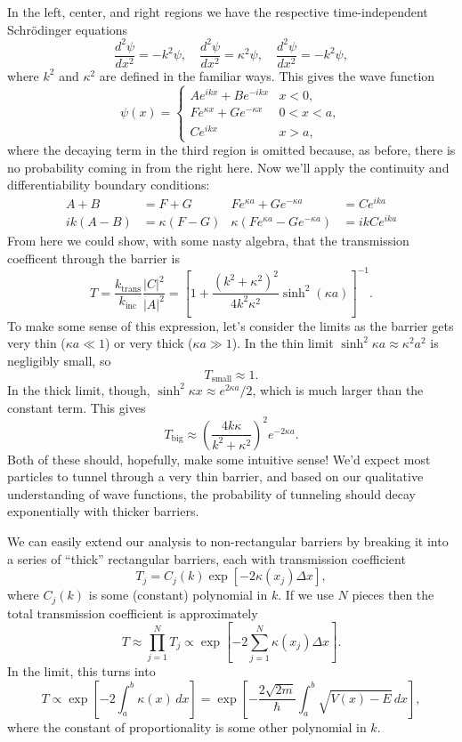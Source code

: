 \documentclass[../p052main.tex]{subfiles}
\begin{document}
In the left, center, and right regions we have the respective time-independent Schrödinger equations
\[ \frac{d^2 \psi}{d x^2} = -k^2 \psi, \quad \frac{d^2 \psi}{d x^2} = \kappa^2 \psi, \quad \frac{d^2 \psi}{d x^2} = -k^2 \psi, \]
where $k^2$ and $\kappa^2$ are defined in the familiar ways.
This gives the wave function
\[ \psi(x) = \begin{cases} Ae^{ikx} + Be^{-ikx} & x < 0, \\ Fe^{\kappa x} + Ge^{-\kappa x} & 0 < x < a, \\ Ce^{ikx} & x > a, \end{cases} \]
where the decaying term in the third region is omitted because, as before, there is no probability coming in from the right here.
Now we'll apply the continuity and differentiability boundary conditions:
\begin{align*}
    A + B &= F + G & Fe^{\kappa a} + Ge^{-\kappa a} &= Ce^{ika} \\
    ik (A - B) &= \kappa (F - G) & \kappa (Fe^{\kappa a} - Ge^{-\kappa a}) &= ik C e^{ika}
\end{align*}
From here we could show, with some nasty algebra, that the transmission coefficent through the barrier is
\[ T = \frac{k_\textrm{trans}}{k_\textrm{inc}} \frac{|C|^2}{|A|^2} = \left[ 1 + \frac{(k^2 + \kappa^2)^2}{4k^2\kappa^2} \sinh^2 (\kappa a) \right]^{-1}. \]
To make some sense of this expression, let's consider the limits as the barrier gets very thin ($\kappa a \ll 1$) or very thick ($\kappa a \gg 1$).
In the thin limit $\sinh^2 \kappa a \approx \kappa^2 a^2$ is negligibly small, so
\[ T_\textrm{small} \approx 1. \]
In the thick limit, though, $\sinh^2 \kappa x \approx e^{2\kappa a} / 2$, which is much larger than the constant term.
This gives
\[ T_\textrm{big} \approx \left( \frac{4k \kappa}{k^2 + \kappa^2} \right)^2 e^{-2\kappa a}. \]
Both of these should, hopefully, make some intuitive sense!
We'd expect most particles to tunnel through a very thin barrier, and based on our qualitative understanding of wave functions, the probability of tunneling should decay exponentially with thicker barriers.

We can easily extend our analysis to non-rectangular barriers by breaking it into a series of ``thick'' rectangular barriers, each with transmission coefficient
\[ T_j = C_j(k) \exp [-2 \kappa (x_j) \Delta x], \]
where $C_j(k)$ is some (constant) polynomial in $k$.
If we use $N$ pieces then the total transmission coefficient is approximately
\[ T \approx \prod_{j=1}^{N} T_j \propto \exp \left[ -2 \sum_{j=1}^{N} \kappa (x_j) \Delta x \right]. \]
In the limit, this turns into
\[ T \propto \exp \left[ -2 \int_{a}^{b} \kappa (x) \,dx \right] = \exp \left[ -\frac{2\sqrt{2m}}{\hbar} \int_{a}^{b} \sqrt{V(x) - E} \,dx \right], \]
where the constant of proportionality is some other polynomial in $k$.
\end{document}
